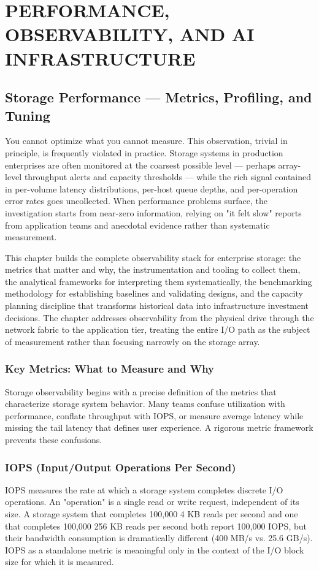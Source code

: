 \part{PERFORMANCE, OBSERVABILITY, AND AI INFRASTRUCTURE}

\chapter{Storage Performance --- Metrics, Profiling, and Tuning}
\label{ch:17}

You cannot optimize what you cannot measure. This observation, trivial in principle, is frequently violated in practice. Storage systems in production enterprises are often monitored at the coarsest possible level --- perhaps array-level throughput alerts and capacity thresholds --- while the rich signal contained in per-volume latency distributions, per-host queue depths, and per-operation error rates goes uncollected. When performance problems surface, the investigation starts from near-zero information, relying on "it felt slow" reports from application teams and anecdotal evidence rather than systematic measurement.

This chapter builds the complete observability stack for enterprise storage: the metrics that matter and why, the instrumentation and tooling to collect them, the analytical frameworks for interpreting them systematically, the benchmarking methodology for establishing baselines and validating designs, and the capacity planning discipline that transforms historical data into infrastructure investment decisions. The chapter addresses observability from the physical drive through the network fabric to the application tier, treating the entire I/O path as the subject of measurement rather than focusing narrowly on the storage array.

\section{Key Metrics: What to Measure and Why}
Storage observability begins with a precise definition of the metrics that characterize storage system behavior. Many teams confuse utilization with performance, conflate throughput with IOPS, or measure average latency while missing the tail latency that defines user experience. A rigorous metric framework prevents these confusions.

\section{IOPS (Input/Output Operations Per Second)}
IOPS measures the rate at which a storage system completes discrete I/O operations. An "operation" is a single read or write request, independent of its size. A storage system that completes 100,000 4 KB reads per second and one that completes 100,000 256 KB reads per second both report 100,000 IOPS, but their bandwidth consumption is dramatically different (400 MB/s vs. 25.6 GB/s). IOPS as a standalone metric is meaningful only in the context of the I/O block size for which it is measured.


